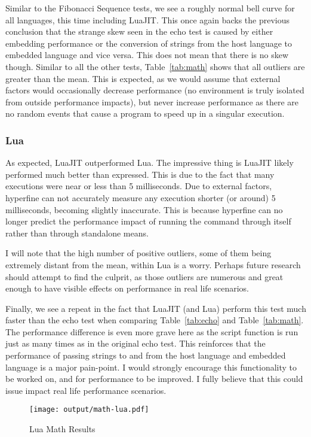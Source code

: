 Similar to the Fibonacci Sequence tests, we see a roughly normal bell curve for all languages, this time including LuaJIT. This once again backs the previous conclusion that the strange skew seen in the echo test is caused by either embedding performance or the conversion of strings from the host language to embedded language and vice versa. This does not mean that there is no skew though. Similar to all the other tests, Table~\ref{tab:math} shows that all outliers are greater than the mean. This is expected, as we would assume that external factors would occasionally decrease performance (no environment is truly isolated from outside performance impacts), but never increase performance as there are no random events that cause a program to speed up in a singular execution.

\subsubsection{Lua}
As expected, LuaJIT outperformed Lua. The impressive thing is LuaJIT likely performed much better than expressed. This is due to the fact that many executions were near or less than 5 milliseconds. Due to external factors, hyperfine can not accurately measure any execution shorter (or around) 5 milliseconds, becoming slightly inaccurate. This is because hyperfine can no longer predict the performance impact of running the command through itself rather than through standalone means.

I will note that the high number of positive outliers, some of them being extremely distant from the mean, within Lua is a worry. Perhaps future research should attempt to find the culprit, as those outliers are numerous and great enough to have visible effects on performance in real life scenarios.

Finally, we see a repeat in the fact that LuaJIT (and Lua) perform this test much faster than the echo test when comparing Table~\ref{tab:echo} and Table~\ref{tab:math}. The performance difference is even more grave here as the script function is run just as many times as in the original echo test. This reinforces that the performance of passing strings to and from the host language and embedded language is a major pain-point. I would strongly encourage this functionality to be worked on, and for performance to be improved. I fully believe that this could issue impact real life performance scenarios.

\begin{figure}[H]
	\centering
		\texttt{[image: output/math-lua.pdf]}
	\caption{Lua Math Results}
	\label{fig:math-lua}
\end{figure}

